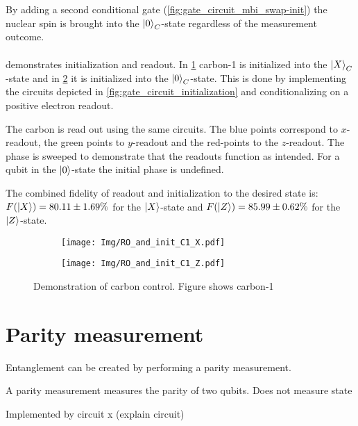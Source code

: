 By adding a second conditional gate (\cref{fig:gate_circuit_mbi_swap-init}) the nuclear spin is brought into the ${\left\vert{0}\right\rangle}_C$-state regardless of the measurement outcome.

\paragraph{}
 demonstrates initialization and readout.
In \cref{fig:carbon_init_x} carbon-1 is initialized into the ${\left\vert{X}\right\rangle}_C$-state and in \cref{fig:carbon_init_Z} it is initialized into the ${\left\vert{0}\right\rangle}_C$-state.
This is done by implementing the circuits depicted in \cref{fig:gate_circuit_initialization} and conditionalizing on a positive electron readout.

The carbon is read out using the same circuits.
The blue points correspond to $x$-readout, the green points to $y$-readout and the red-points to the $z$-readout.
The phase is sweeped to demonstrate that the readouts function as intended.
For a qubit in the ${\left\vert{0}\right\rangle}$-state the initial phase is undefined.

The combined fidelity of readout and initialization to the desired state is: $F({\left\vert{X}\right\rangle}) = 80.11 \pm 1.69\% $ for the ${\left\vert{X}\right\rangle}$-state and $F({\left\vert{Z}\right\rangle}) = 85.99 \pm 0.62\%$ for the ${\left\vert{Z}\right\rangle}$-state.

\begin{figure}[htbp]
    \begin{subfigure}[t]{0.49\textwidth}\centering
        \caption{}
        \texttt{[image: Img/RO\_and\_init\_C1\_X.pdf]}
        \label{fig:carbon_init_x}
    \end{subfigure}
        \begin{subfigure}[t]{0.49\textwidth}\centering
        \caption{}
        \texttt{[image: Img/RO\_and\_init\_C1\_Z.pdf]}
        \label{fig:carbon_init_Z}
    \end{subfigure}
    \caption{Demonstration of carbon control. Figure shows carbon-1 }
    \label{fig:single_qubit_initialization}
\end{figure}


\section{Parity measurement}
Entanglement can be created by performing a parity measurement.

A parity measurement measures the parity of two qubits. Does not measure state

Implemented by circuit x
(explain circuit)


